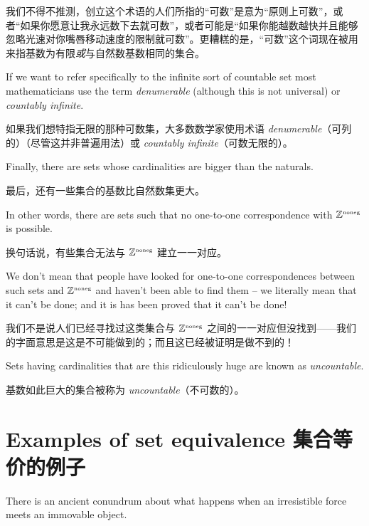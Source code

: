 我们不得不推测，创立这个术语的人们所指的“可数”是意为“原则上可数”，或者“如果你愿意让我永远数下去就可数”，或者可能是“如果你能越数越快并且能够忽略光速对你嘴唇移动速度的限制就可数”。更糟糕的是，“可数”这个词现在被用来指基数为有限\emph{或}与自然数基数相同的集合。

If we want to refer specifically to the infinite sort of countable set most mathematicians
use the term \emph{denumerable} (although this is not universal) or  \emph{countably infinite}.

如果我们想特指无限的那种可数集，大多数数学家使用术语 \emph{denumerable}（可列的）（尽管这并非普遍用法）或  \emph{countably infinite}（可数无限的）。

Finally, there are sets
whose cardinalities are bigger than the naturals.

最后，还有一些集合的基数比自然数集更大。

In other words, there are
sets such that no one-to-one correspondence with ${\mathbb Z}^{\mbox{\tiny noneg}}$ is possible.

换句话说，有些集合无法与 ${\mathbb Z}^{\mbox{\tiny noneg}}$ 建立一一对应。

We don't mean that people have looked for one-to-one correspondences
between such sets and ${\mathbb Z}^{\mbox{\tiny noneg}}$ and haven't been able to find them -- we literally mean that it can't be done;
and it is has been proved that it can't be done!

我们不是说人们已经寻找过这类集合与 ${\mathbb Z}^{\mbox{\tiny noneg}}$ 之间的一一对应但没找到——我们的字面意思是这是不可能做到的；而且这已经被证明是做不到的！

Sets having cardinalities that are this ridiculously huge are known as  \emph{uncountable}.

基数如此巨大的集合被称为  \emph{uncountable}（不可数的）。

\clearpage





\newpage

\section{Examples of set equivalence 集合等价的例子}
\label{sec:examp_set_eq}

There is an ancient conundrum about what happens when an irresistible force
meets an immovable object.

